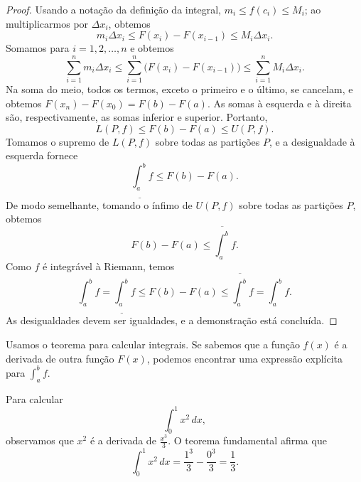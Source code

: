 \begin{proof}
Usando a notação da definição da integral,
$m_i \leq f(c_i) \leq M_i$; ao multiplicarmos por $\Delta x_i$, obtemos
\begin{equation*}
m_i \Delta x_i \leq F(x_i) - F(x_{i-1}) \leq M_i \Delta x_i .
\end{equation*}
Somamos para $i = 1,2, \ldots, n$ e obtemos
\begin{equation*}
\sum_{i=1}^n m_i \Delta x_i
\leq \sum_{i=1}^n \bigl(F(x_i) - F(x_{i-1}) \bigr)
\leq \sum_{i=1}^n M_i \Delta x_i .
\end{equation*}
Na soma do meio, todos os termos, exceto o primeiro e o último, se cancelam,
e obtemos $F(x_n)-F(x_0) = F(b)-F(a)$. As somas à esquerda e à direita
são, respectivamente, as somas inferior e superior. Portanto,
\begin{equation*}
L(P,f) \leq F(b)-F(a) \leq U(P,f) .
\end{equation*}
Tomamos o supremo de $L(P,f)$ sobre todas as partições $P$, e a desigualdade
à esquerda fornece
\begin{equation*}
\underline{\int_a^b} f \leq F(b)-F(a) .
\end{equation*}
De modo semelhante, tomando o ínfimo de $U(P,f)$ sobre todas as partições
$P$, obtemos
\begin{equation*}
F(b)-F(a) \leq \overline{\int_a^b} f .
\end{equation*}
Como $f$ é integrável à Riemann, temos
\begin{equation*}
\int_a^b f =
\underline{\int_a^b} f \leq F(b)-F(a) \leq \overline{\int_a^b} f
= \int_a^b f .
\end{equation*}
As desigualdades devem ser igualdades, e a demonstração está concluída.
\end{proof}

Usamos o teorema para calcular integrais. Se sabemos que a função $f(x)$ é
a derivada de outra função $F(x)$, podemos encontrar uma expressão explícita
para $\int_a^b f$.

\begin{example}
Para calcular
\begin{equation*}
\int_0^1 x^2 \,dx ,
\end{equation*}
observamos que $x^2$ é a derivada de $\frac{x^3}{3}$.
O teorema fundamental afirma que
\begin{equation*}
\int_0^1 x^2 \,dx =
\frac{1^3}{3}
-
\frac{0^3}{3}
= \frac{1}{3}.
\end{equation*}
\end{example}

